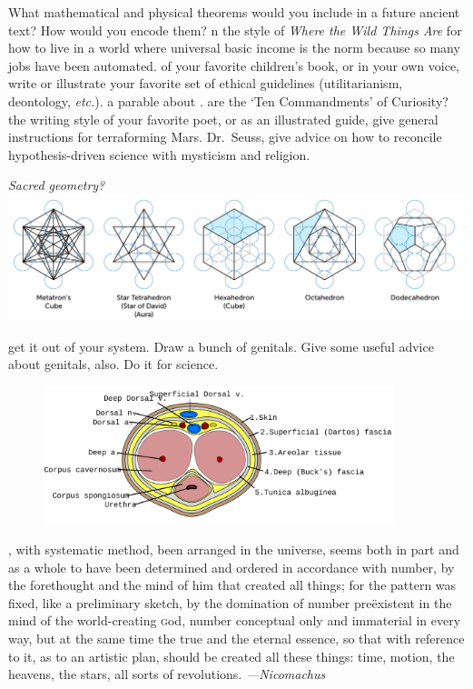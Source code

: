 \bverse What mathematical and physical theorems would you include in a future ancient text? How would you encode them?
\newpage
\bversenonum {} {n the style of} \textit{Where the Wild Things Are} for how to live in a world where universal basic income is the norm because so many jobs have been automated.
\newpage%
\bversenonum {} of your favorite children's book, or in your own voice, write or illustrate your favorite set of ethical guidelines (utilitarianism, deontology, \textit{etc.}).
\newpage%
\bversenonum {} a parable about \color{red}{r}\color{orange}{a}\color{yellow}{i}\color{green}{n}\color{teal}{b}\color{blue}{o}\color{violet}{w}\color{purple}{s}\color{black}.
\newpage%
\bversenonum {} are the `Ten Commandments' of Curiosity?
\newpage%
\bversenonum {} the writing style of your favorite poet, or as an illustrated guide, give general instructions for terraforming Mars.
\newpage%
\bversenonum {} Dr.~Seuss, give advice on how to reconcile hypothesis-driven science with mysticism and religion.
\newpage%
\hfill
\begin{center}
\textit{Sacred geometry?}
\bigskip
\includegraphics[width=\textwidth]{images/Metatron_solids.pdf}
\end{center}
\newpage
\bversenonum {} get it out of your system. Draw a bunch of genitals. Give some useful advice about genitals, also. Do it for science.
\bigskip
\begin{figure}[h]
\centering
\includegraphics[width=4in]{images/Penis_cross_section.pdf}
\end{figure}
\newpage
\bversenonum {}, with systematic method, been arranged in the universe, seems both in part and as a whole to have been determined and ordered in accordance with number, by the forethought and the mind of him that created all things; for the pattern was fixed, like a preliminary sketch, by the domination of number pre\"existent in the mind of the world-creating \textsc{g}od, number conceptual only and immaterial in every way, but at the same time the true and the eternal essence, so that with reference to it, as to an artistic plan, should be created all these things: time, motion, the heavens, the stars, all sorts of revolutions. \textit{---Nicomachus}
